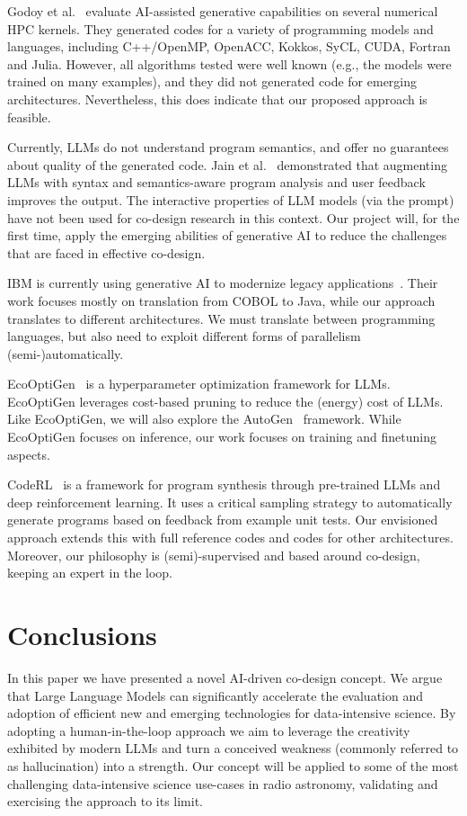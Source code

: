 \documentclass[a4wide,twocolumn]{article}
\begin{document}
Godoy et al.~\cite{godoy_evaluation_2023} evaluate AI-assisted generative capabilities on several numerical HPC kernels. They generated codes for a variety of programming models and languages, including C++/OpenMP, OpenACC, Kokkos, SyCL, CUDA, Fortran and Julia. However, all algorithms tested were well known (e.g., the models were trained on many examples), and they did not generated code for emerging architectures. Nevertheless, this does indicate that our proposed approach is feasible.

Currently, LLMs do not understand program semantics, and offer no guarantees about quality of the generated code. Jain et al.~\cite{jain_jigsaw_2022} demonstrated that augmenting LLMs with syntax and semantics-aware program analysis and user feedback improves the output. The interactive properties of LLM models (via the prompt) have not been used for co-design research in this context. Our project will, for the first time, apply the emerging abilities of generative AI to reduce the challenges that are faced in effective co-design. 

IBM is currently using generative AI to modernize legacy applications~\cite{noauthor_harnessing_nodate}. Their work focuses mostly on translation from COBOL to Java, while our approach translates to different architectures. We must translate between programming languages, but also need to exploit different forms of parallelism (semi-)automatically.

EcoOptiGen~\cite{wang_cost-effective_2023} is a hyperparameter optimization framework for LLMs. EcoOptiGen leverages cost-based pruning to reduce the (energy) cost of LLMs. Like EcoOptiGen, we will also explore the AutoGen~\cite{wu_autogen_2023} framework. While EcoOptiGen focuses on inference, our work focuses on training and finetuning aspects. 

CodeRL~\cite{le_coderl_2022} is a framework for program synthesis through pre-trained LLMs and deep reinforcement learning. It uses a critical sampling strategy to automatically generate programs based on feedback from example unit tests. Our envisioned approach extends this with full reference codes and codes for other architectures. Moreover, our philosophy is (semi)-supervised and based around co-design, keeping an expert in the loop.

\section{Conclusions}
In this paper we have presented a novel AI-driven co-design concept. We argue that Large Language Models can significantly accelerate the evaluation and adoption of efficient new and emerging technologies for data-intensive science. By adopting a human-in-the-loop approach we aim to leverage the creativity exhibited by modern LLMs and turn a conceived weakness (commonly referred to as hallucination) into a strength. Our concept will be applied to some of the most challenging data-intensive science use-cases in radio astronomy, validating and exercising the approach to its limit.
\end{document}
